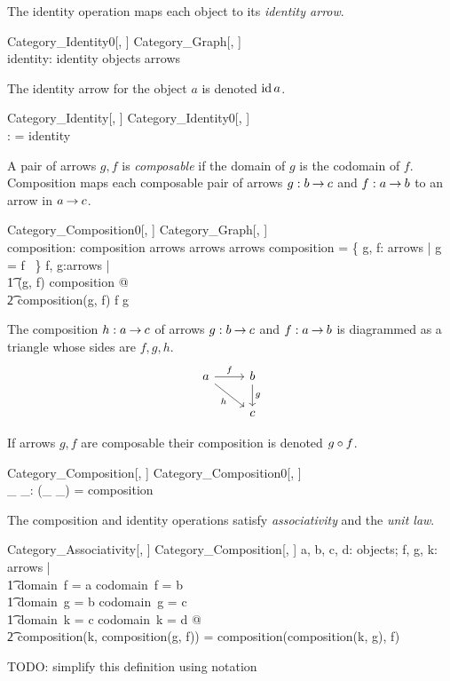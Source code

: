 \documentclass{amsart}
\begin{document}
The identity operation maps each object to its \textit{identity arrow}.
\begin{schema}{Category\_Identity0}[\genO, \genA]
	Category\_Graph[\genO, \genA] \\
	identity: \genO \pfun \genA
\where
	identity \in objects \fun arrows
\end{schema}

The identity arrow for the object $a$ is denoted $\operatorname{id} a$.
\begin{schema}{Category\_Identity}[\genO, \genA]
	Category\_Identity0[\genO, \genA] \\
	\idCat: \genO \pfun \genA
\where
	\idCat = identity
\end{schema}

A pair of arrows $g, f$ is \textit{composable} if the domain of $g$ is the codomain of $f$.
Composition maps each composable pair of arrows $g: b \mathbin{\rightarrow} c$ and $f: a \mathbin{\rightarrow} b$ to an arrow in $a \mathbin{\rightarrow} c$.
\begin{schema}{Category\_Composition0}[\genO, \genA]
	Category\_Graph[\genO, \genA] \\
	composition: \genA \cross \genA \pfun \genA
\where
	composition \in arrows \cross arrows \pfun arrows
\also
	\dom composition = \{ g, f: arrows | \domCat g = \codCat f ~\}
\also
	\forall f, g:arrows | \\
	\t1	(g, f) \in \dom composition @ \\
	\t2		composition(g, f) \in \domCat f \arrCat \codCat g
\end{schema}

The composition $h: a \mathbin{\rightarrow} c$ of arrows $g: b \mathbin{\rightarrow} c$ and $f: a \mathbin{\rightarrow} b$ is diagrammed as a triangle whose sides are $f, g, h$.
$$
  \begin{tikzcd}
    a \arrow{r}{f} \arrow[swap]{dr}{h} & b \arrow{d}{g} \\
     & c
  \end{tikzcd}
$$

If arrows $g, f$ are composable their composition is denoted $g \mathbin{\circ} f$.
\begin{schema}{Category\_Composition}[\genO, \genA]
	Category\_Composition0[\genO, \genA] \\
	\_ \compCat \_: \genA \cross \genA \pfun \genA
\where
	(\_ \compCat \_) = composition
\end{schema}

The composition and identity operations satisfy \textit{associativity} and the \textit{unit law}.
\begin{schema}{Category\_Associativity}[\genO, \genA]
	Category\_Composition[\genO, \genA]
\where
	\forall a, b, c, d: objects; f, g, k: arrows | \\
	\t1	domain~f = a \land codomain~f = b \land \\
	\t1	domain~g = b \land codomain~g = c \land \\
	\t1	domain~k = c \land codomain~k = d @\\
	\t2		composition(k, composition(g, f)) = composition(composition(k, g), f)	
\end{schema}
TODO: simplify this definition using notation
\end{document}
